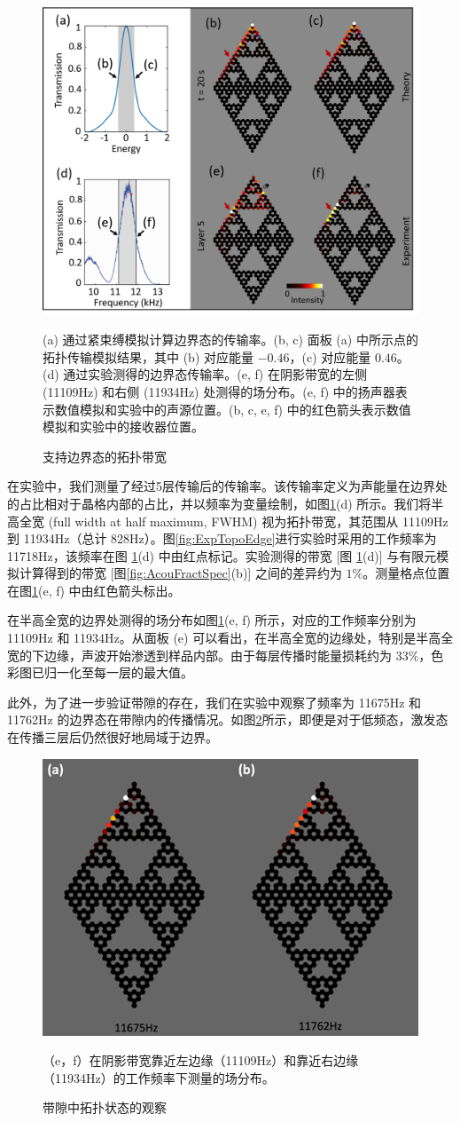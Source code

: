 \begin{figure}[htbp]
    \centering
    \includegraphics[width=0.75\linewidth]{figure/FracHaldExp/BandGap.png}
    \caption{支持边界态的拓扑带宽}(a) 通过紧束缚模拟计算边界态的传输率。(b, c) 面板 (a) 中所示点的拓扑传输模拟结果，其中 (b) 对应能量 $-0.46$，(c) 对应能量 $0.46$。(d) 通过实验测得的边界态传输率。(e, f) 在阴影带宽的左侧 (11109Hz) 和右侧 (11934Hz) 处测得的场分布。(e, f) 中的扬声器表示数值模拟和实验中的声源位置。(b, c, e, f) 中的红色箭头表示数值模拟和实验中的接收器位置。
    \label{fig:BandGap}
\end{figure}

在实验中，我们测量了经过5层传输后的传输率。该传输率定义为声能量在边界处的占比相对于晶格内部的占比，并以频率为变量绘制，如图\ref{fig:BandGap}(d) 所示。我们将半高全宽 (full width at half maximum, FWHM) 视为拓扑带宽，其范围从 11109Hz 到 11934Hz（总计 828Hz）。图\ref{fig:ExpTopoEdge}进行实验时采用的工作频率为 11718Hz，该频率在图 \ref{fig:BandGap}(d) 中由红点标记。实验测得的带宽 [图 \ref{fig:BandGap}(d)] 与有限元模拟计算得到的带宽 [图\ref{fig:AcouFractSpec}(b)] 之间的差异约为 $1\%$。测量格点位置在图\ref{fig:BandGap}(e, f) 中由红色箭头标出。

在半高全宽的边界处测得的场分布如图\ref{fig:BandGap}(e, f) 所示，对应的工作频率分别为 11109Hz 和 11934Hz。从面板 (e) 可以看出，在半高全宽的边缘处，特别是半高全宽的下边缘，声波开始渗透到样品内部。由于每层传播时能量损耗约为 $33\%$，色彩图已归一化至每一层的最大值。

此外，为了进一步验证带隙的存在，我们在实验中观察了频率为 11675Hz 和 11762Hz 的边界态在带隙内的传播情况。如图\ref{fig:BandGap2}所示，即便是对于低频态，激发态在传播三层后仍然很好地局域于边界。
\begin{figure}[htbp]
    \centering
    \includegraphics[width=0.5\linewidth]{figure/FracHaldExp/BandGap2.png}
    \caption{带隙中拓扑状态的观察}（e，f）在阴影带宽靠近左边缘（11109Hz）和靠近右边缘（11934Hz）的工作频率下测量的场分布。
    \label{fig:BandGap2}
\end{figure}
